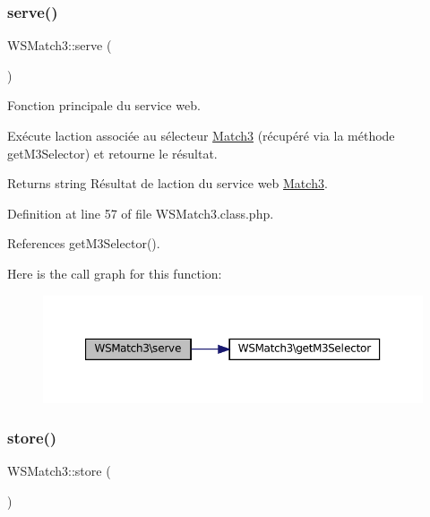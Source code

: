 \subsubsection{\texorpdfstring{serve()}{serve()}}
{\footnotesize\ttfamily W\+S\+Match3\+::serve (\begin{DoxyParamCaption}{ }\end{DoxyParamCaption})}

Fonction principale du service web.

Exécute l\textquotesingle{}action associée au sélecteur \hyperlink{class_match3}{Match3} (récupéré via la méthode get\+M3\+Selector) et retourne le résultat.

\begin{DoxyReturn}{Returns}
string Résultat de l\textquotesingle{}action du service web \hyperlink{class_match3}{Match3}. 
\end{DoxyReturn}


Definition at line 57 of file W\+S\+Match3.\+class.\+php.



References get\+M3\+Selector().

Here is the call graph for this function\+:\nopagebreak
\begin{figure}[H]
\begin{center}
\leavevmode
\includegraphics[width=350pt]{class_w_s_match3_a63e3018032202b5d6f55de7013500aa3_cgraph}
\end{center}
\end{figure}
\mbox{\label{class_w_s_match3_a26d2ad6c89b5ec23676d9058351a85ad}} 
\subsubsection{\texorpdfstring{store()}{store()}}
{\footnotesize\ttfamily W\+S\+Match3\+::store (\begin{DoxyParamCaption}{ }\end{DoxyParamCaption})\hspace{0.3cm}{\ttfamily [protected]}}

